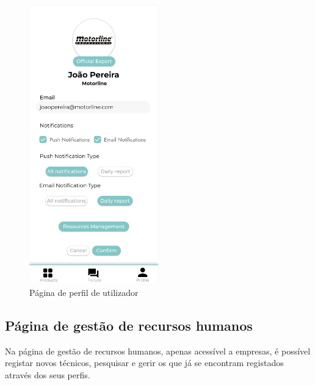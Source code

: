 \begin{figure}[htb]
    \centering
    \includegraphics[width=0.5\textwidth]{images/mockups/user_profile.png}
    \caption{Página de perfil de utilizador}
    \label{fig:30}
\end{figure}

\subsection{Página de gestão de recursos humanos}

Na página de gestão de recursos humanos, apenas acessível a empresas, é possível registar novos técnicos, pesquisar e gerir os que já se encontram registados através dos seus perfis.

